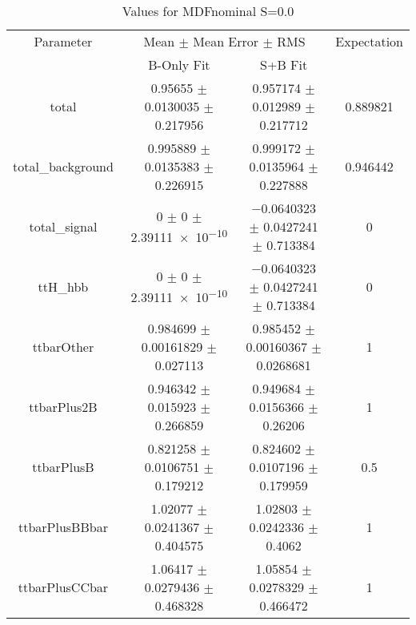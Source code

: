 \begin{table}
\centering
\caption{Values for MDFnominal S=0.0}
\begin{tabular}{cccc}
\toprule
Parameter & \multicolumn{2}{c}{Mean $\pm$ Mean Error $\pm$ RMS} & Expectation\\
 & B-Only Fit & S+B Fit & \\
\midrule
total & \num{0.95655} $\pm$ \num{0.0130035} $\pm$ \num{0.217956} & \num{0.957174} $\pm$ \num{0.012989} $\pm$ \num{0.217712} & \num{0.889821}\\
total\_background & \num{0.995889} $\pm$ \num{0.0135383} $\pm$ \num{0.226915} & \num{0.999172} $\pm$ \num{0.0135964} $\pm$ \num{0.227888} & \num{0.946442}\\
total\_signal & \num{0} $\pm$ \num{0} $\pm$ \num{2.39111e-10} & \num{-0.0640323} $\pm$ \num{0.0427241} $\pm$ \num{0.713384} & \num{0}\\
ttH\_hbb & \num{0} $\pm$ \num{0} $\pm$ \num{2.39111e-10} & \num{-0.0640323} $\pm$ \num{0.0427241} $\pm$ \num{0.713384} & \num{0}\\
ttbarOther & \num{0.984699} $\pm$ \num{0.00161829} $\pm$ \num{0.027113} & \num{0.985452} $\pm$ \num{0.00160367} $\pm$ \num{0.0268681} & \num{1}\\
ttbarPlus2B & \num{0.946342} $\pm$ \num{0.015923} $\pm$ \num{0.266859} & \num{0.949684} $\pm$ \num{0.0156366} $\pm$ \num{0.26206} & \num{1}\\
ttbarPlusB & \num{0.821258} $\pm$ \num{0.0106751} $\pm$ \num{0.179212} & \num{0.824602} $\pm$ \num{0.0107196} $\pm$ \num{0.179959} & \num{0.5}\\
ttbarPlusBBbar & \num{1.02077} $\pm$ \num{0.0241367} $\pm$ \num{0.404575} & \num{1.02803} $\pm$ \num{0.0242336} $\pm$ \num{0.4062} & \num{1}\\
ttbarPlusCCbar & \num{1.06417} $\pm$ \num{0.0279436} $\pm$ \num{0.468328} & \num{1.05854} $\pm$ \num{0.0278329} $\pm$ \num{0.466472} & \num{1}\\
\bottomrule
\end{tabular}
\end{table}